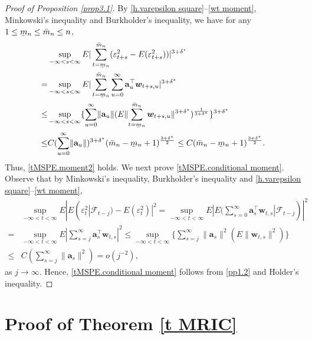 \documentclass[ejsv2]{imsart}
\newcommand{\ubar}[1]{\underaccent{\bar}{#1}}
\theoremstyle{plain}
\theoremstyle{definition}
\theoremstyle{remark}
\begin{document}
\begin{proof}[Proof of Proposition \ref{prop3.1}]
By \eqref{h.varepsilon square}--\eqref{wt moment}, Minkowski's inequality and Burkholder's inequality, {we have for any $1 \leq \ubar{m}_{n}\leq \bar{m}_{n} \leq n$,
\begin{equation}\label{pp1.1}
\begin{split}
     & \sup\limits_{-\infty<s<\infty}E|\sum_{t=\ubar{m}_{n}}^{\bar{m}_{n}}(\varepsilon_{t+s}^2-E(\varepsilon_{t+s}^2))|^{3+\delta^\star} \\
     =&  \sup\limits_{-\infty<s<\infty}E|\sum_{t=\ubar{m}_{n}}^{\bar{m}_{n}}\sum_{u=0}^{\infty}\mathbf{a}^\top_u\bm{w}_{t+s,u}|^{3+\delta^\star}\\
     \leq& \sup\limits_{-\infty<s<\infty}\{\sum_{u=0}^{\infty}\lVert\mathbf{a}_u\rVert(E\lVert
     \sum_{t=\ubar{m}_{n}}^{\bar{m}_{n}}\bm{w}_{t+s,u}\rVert^{3+\delta^\star})^{\frac{1}{3+\delta^\star}}\}^{3+\delta^\star}\\
     \leq & C(\sum_{u=0}^{\infty}\lVert\mathbf{a}_u\rVert)^{3+\delta^\star}(\bar{m}_{n}-\ubar{m}_{n}+1)^{\frac{3+\delta^\star}{2}}\leq C(\bar{m}_{n}-\ubar{m}_{n}+1)^{\frac{3+\delta^\star}{2}}.
\end{split}
\end{equation}}
Thus, \eqref{tMSPE.moment2} holds. We next prove \eqref{tMSPE.conditional moment}. Observe that by Minkowski's inequality, Burkholder's inequality and \eqref{h.varepsilon square}--\eqref{wt moment},
\begin{equation}\label{pp1.2}
\begin{split}
     & \sup\limits_{-\infty<t<\infty} E|E(\varepsilon_t^2|\mathcal{F}_{t-j})-E(\varepsilon_t^2)|^2 =  \sup\limits_{-\infty<t<\infty} E|E(\sum_{s=0}^{\infty}\mathbf{a}^\top_s\bm{w}_{t,s}|\mathcal{F}_{t-j})|^2\\
    =&\sup\limits_{-\infty<t<\infty} E|\sum_{s=j}^{\infty}\mathbf{a}^\top_s\bm{w}_{t,s}|^2\leq  \sup\limits_{-\infty<t<\infty}\{\sum_{s=j}^{\infty}\lVert\mathbf{a}_s\rVert^2(E\lVert\bm{w}_{t,s}\rVert^2)\}\\
    \leq& C(\sum_{s=j}^{\infty}\lVert\mathbf{a}_s\rVert^2)=o(j^{-2}),
\end{split}
\end{equation}
as $j\to\infty$. Hence, \eqref{tMSPE.conditional moment} follows from \eqref{pp1.2} and H$\ddot{\mathrm{o}}$lder's inequality.
\end{proof}

\section{Proof of Theorem \ref{t MRIC}}\label{appC}
\end{document}
